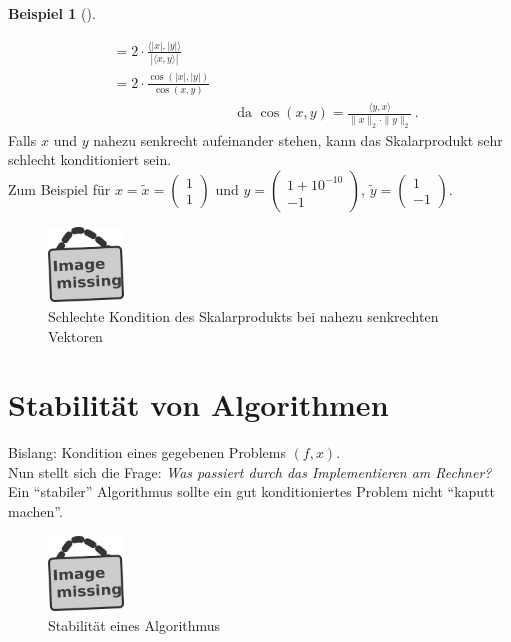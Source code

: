 \documentclass[ngerman,fontsize=11pt, paper=a4, parskip=half, titlepage=true, toc=bib]{scrbook}
\theoremstyle{definition}
\newtheorem{Bsp}[Def]{Beispiel}
\theoremstyle{plain}
\newcommand{\sectione}[1]{ \setcounter{equation}{0}\section{#1}}
\newenvironment{Bspe}[1][]{ %
  \begin{Bsp}[#1]
  }
  {
  \end{Bsp}
  \addtocounter{subsection}{1}
}
\begin{document}
\begin{Bspe}
\begin{enumerate}[a)]
\begin{align*}
                                                         &= 2\cdot \frac{\langle |x|,|y|\rangle}{|\langle x,y\rangle|} \\
                                                         &= 2 \cdot \frac{\cos(|x|, |y|)}{\cos(x,y)}  \\
                                                         &&&				\text{	da  }\cos(x,y) = \frac{\langle y,x \rangle}{\|x\|_2 \cdot \|y\|_2} \, . 
    \end{align*}
    Falls $x$ und $y$ nahezu senkrecht aufeinander stehen, kann das Skalarprodukt sehr schlecht konditioniert sein. \\
    Zum Beispiel für $x=\widetilde{x} = \begin{pmatrix} 1 \\1 \end{pmatrix}$
    und $y=\begin{pmatrix} 1+10^{-10} \\-1 \end{pmatrix},
    \, \widetilde{y}=\begin{pmatrix} 1 \\-1 \end{pmatrix}$. \\
    \begin{figure}
      \parbox{\linewidth}{
        \centering
        \includegraphics[width=2cm]{images/image_missing.jpg}
      }
      \caption{Schlechte Kondition des Skalarprodukts bei nahezu senkrechten Vektoren}
    \end{figure}
  \end{enumerate}	
\end{Bspe}

\sectione{Stabilität von Algorithmen}
Bislang: Kondition eines gegebenen Problems $(f,x)$. \\
Nun stellt sich die Frage: \textit{Was passiert durch das Implementieren am Rechner? }\\
Ein \enquote{stabiler} Algorithmus sollte ein gut konditioniertes Problem nicht \enquote{kaputt machen}.\\

\begin{figure}
  \parbox{\linewidth}{
    \centering
    \includegraphics[width=2cm]{images/image_missing.jpg}
  }
  \caption{Stabilität eines Algorithmus}
\end{figure}
\end{document}
